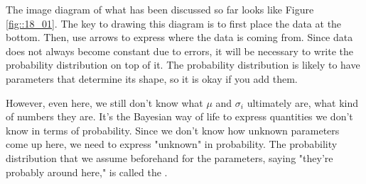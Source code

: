 \documentclass{ltjsbook}
\begin{document}
The image diagram of what has been discussed so far looks like Figure \ref{fig::18_01}. The key to drawing this diagram is to first place the data at the bottom. Then, use arrows to express where the data is coming from. Since data does not always become constant due to errors, it will be necessary to write the probability distribution on top of it. The probability distribution is likely to have parameters that determine its shape, so it is okay if you add them.




However, even here, we still don't know what $\mu$ and $\sigma_i$ ultimately are, what kind of numbers they are. It's the Bayesian way of life to express quantities we don't know in terms of probability. Since we don't know how unknown parameters come up here, we need to express "unknown" in probability. The probability distribution that we assume beforehand for the parameters, saying "they're probably around here," is called the .
\end{document}
